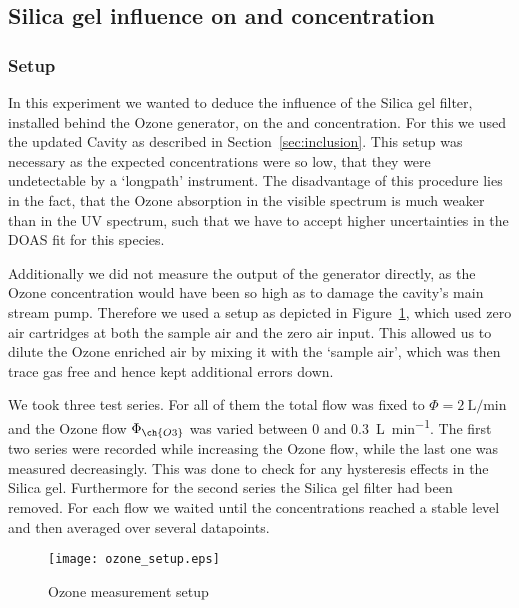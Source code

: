 \subsection{Silica gel influence on  and  concentration}
\label{sec:silica}

\subsubsection{Setup}
\label{sec:silica-setup}

In this experiment we wanted to deduce the influence of the Silica gel
filter, installed behind the Ozone generator, on the  and
 concentration. For this we used the updated Cavity as
described in Section~\ref{sec:inclusion}. This setup was necessary as
the expected  concentrations were so low, that they were
undetectable by a `longpath' instrument. The disadvantage of this
procedure lies in the fact, that the Ozone absorption in the visible
spectrum is much weaker than in the UV spectrum, such that we have to
accept higher uncertainties in the DOAS fit for this species. 

Additionally we did not measure the output of the generator directly,
as the Ozone concentration would have been so high as to damage the cavity's
main stream pump. Therefore we used a setup as depicted
in Figure~\ref{fig:ozone-flow-setup}, which used zero air cartridges at
both the sample air and the zero air input. This allowed us to dilute
the Ozone enriched air by mixing it with the `sample air', which was
then trace gas free and hence kept additional errors down.

We took three test series. For all of them the total flow was fixed to
$\Phi = \SI{2}{\liter\per\minute}$ and the Ozone flow $\Phi_{\ch{O3}}$
was varied between \num{0} and \SI{0.3}{\liter\per\minute}. The first
two series were recorded while increasing the Ozone flow, while the
last one was measured decreasingly. This was done to check for any
hysteresis effects in the Silica gel. Furthermore for the second
series the Silica gel filter had been removed. For each flow we waited
until the concentrations reached a stable level and then averaged over
several datapoints.

\begin{figure}[htbp]
  \centering
  \texttt{[image: ozone\_setup.eps]}
  \caption{Ozone measurement setup}
  \label{fig:ozone-flow-setup}
\end{figure}

